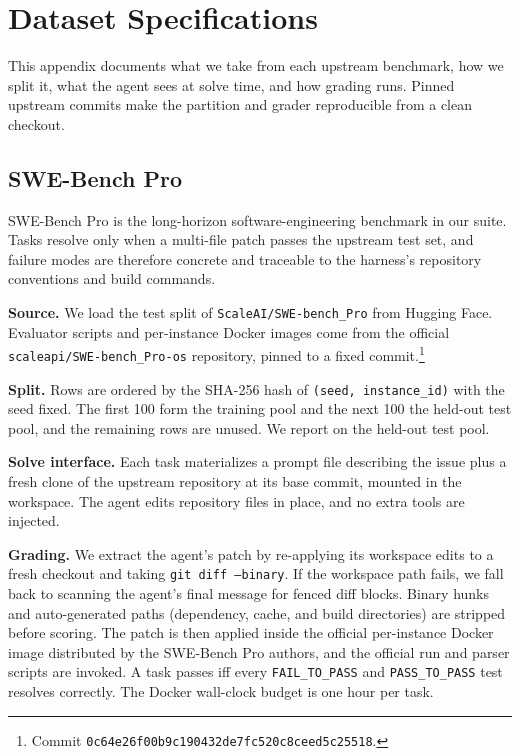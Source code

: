\documentclass{llmxive}
\begin{document}
\section{Dataset Specifications}\label{app:datasets}

 This appendix documents what we take from each upstream benchmark, how we split it, what the agent sees at solve time, and how grading runs.
Pinned upstream commits make the partition and grader reproducible from a clean checkout.

\subsection{SWE-Bench Pro}

SWE-Bench Pro \citep{deng2025swebenchpro} is the long-horizon software-engineering benchmark in our suite.
Tasks resolve only when a multi-file patch passes the upstream test set, and failure modes are therefore concrete and traceable to the harness's repository conventions and build commands.

\noindent\textbf{Source.}
We load the test split of \texttt{ScaleAI/SWE-bench\_Pro} from Hugging Face.
Evaluator scripts and per-instance Docker images come from the official \texttt{scaleapi/SWE-bench\_Pro-os} repository, pinned to a fixed commit.\footnote{Commit \texttt{0c64e26f00b9c190432de7fc520c8ceed5c25518}.}

\noindent\textbf{Split.}
Rows are ordered by the SHA-256 hash of \texttt{(seed, instance\_id)} with the seed fixed.
The first 100 form the training pool and the next 100 the held-out test pool, and the remaining rows are unused.
We report on the held-out test pool.

\noindent\textbf{Solve interface.}
Each task materializes a prompt file describing the issue plus a fresh clone of the upstream repository at its base commit, mounted in the workspace.
The agent edits repository files in place, and no extra tools are injected.

\noindent\textbf{Grading.}
We extract the agent's patch by re-applying its workspace edits to a fresh checkout and taking \texttt{git diff --binary}.
If the workspace path fails, we fall back to scanning the agent's final message for fenced diff blocks.
Binary hunks and auto-generated paths (dependency, cache, and build directories) are stripped before scoring.
The patch is then applied inside the official per-instance Docker image distributed by the SWE-Bench Pro authors, and the official run and parser scripts are invoked.
A task passes iff every \texttt{FAIL\_TO\_PASS} and \texttt{PASS\_TO\_PASS} test resolves correctly.
The Docker wall-clock budget is one hour per task.
\end{document}
